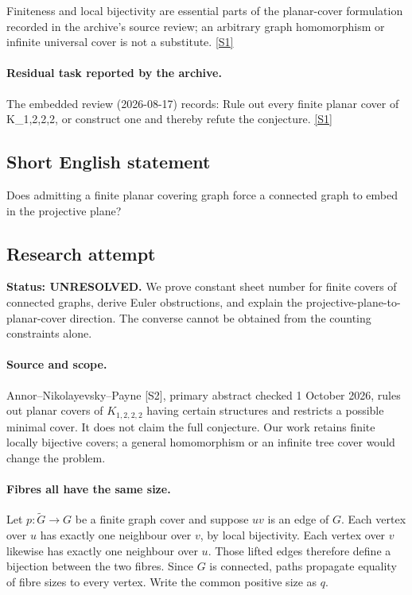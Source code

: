 \documentclass[11pt,a4paper]{article}
\newcommand{\sref}[2]{\hyperlink{source:#1:#2}{[S#2]}}
\begin{document}
Finiteness and local bijectivity are essential parts of the planar-cover formulation recorded in the archive’s source review; an arbitrary graph homomorphism or infinite universal cover is not a substitute. \sref{statement}{1}

\paragraph{Residual task reported by the archive.}

The embedded review (2026-08-17) records: Rule out every finite planar cover of K\_{1,2,2,2}, or construct one and thereby refute the conjecture. \sref{statement}{1}

\subsection{Short English statement}

Does admitting a finite planar covering graph force a connected graph to embed in the projective plane?

\subsection{Research attempt}
\textbf{Status: UNRESOLVED.} We prove constant sheet number for finite covers of connected graphs, derive Euler obstructions, and explain the projective-plane-to-planar-cover direction. The converse cannot be obtained from the counting constraints alone.

\paragraph{Source and scope.}
Annor--Nikolayevsky--Payne [S2], primary abstract checked 1 October 2026, rules out planar covers of $K_{1,2,2,2}$ having certain structures and restricts a possible minimal cover. It does not claim the full conjecture. Our work retains finite locally bijective covers; a general homomorphism or an infinite tree cover would change the problem.

\paragraph{Fibres all have the same size.}
Let $p:\widetilde G\to G$ be a finite graph cover and suppose $uv$ is an edge of $G$. Each vertex over $u$ has exactly one neighbour over $v$, by local bijectivity. Each vertex over $v$ likewise has exactly one neighbour over $u$. Those lifted edges therefore define a bijection between the two fibres. Since $G$ is connected, paths propagate equality of fibre sizes to every vertex. Write the common positive size as $q$.
\end{document}
